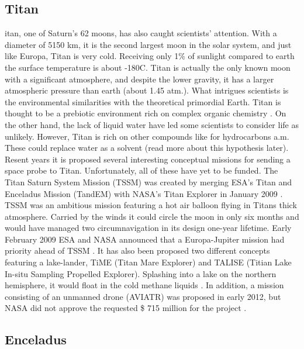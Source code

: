 \begin{multicols}{2}
\iffalse
\subsection{Titan}


 
itan, one of Saturn's 62 moons, has also caught scientists' attention.
With a diameter of 5150 km, it is the second largest moon in the solar system, and just like Europa, Titan is very cold.
Receiving only 1\% of sunlight compared to earth the surface temperature is about -180\degree C.
Titan is actually the only known moon with a significant atmosphere, and despite the lower gravity, it has a larger atmospheric pressure than earth (about 1.45 atm.).
What intrigues scientists is the environmental similarities with the theoretical primordial Earth.
Titan is thought to be a prebiotic environment rich on complex organic chemistry \cite{RichOrganics}. On the other hand, the lack of liquid water have led some scientists to consider life as unlikely.
However, Titan is rich on other compounds like for hydrocarbons a.m.
These could replace water as a solvent (read more about this hypothesis later).
Resent years it is proposed several interesting conceptual missions for sending a space probe to Titan. Unfortunately, all of these have yet to be funded.
The Titan Saturn System Mission (TSSM) was created by merging ESA’s Titan and Enceladus Mission (TandEM) with NASA’s Titan Explorer in January 2009 \cite{FPlan10}.
TSSM was an ambitious mission featuring a hot air balloon flying in Titans thick atmosphere.
Carried by the winds it could circle the moon in only six months and would have managed two circumnavigation in its design one-year lifetime.
Early February 2009 ESA and NASA announced that a Europa-Jupiter mission had priority ahead of TSSM \cite{FPlan07}.
It has also been proposed two different concepts featuring a lake-lander, TiME (Titan Mare Explorer) and TALISE (Titian Lake In-situ Sampling Propelled Explorer).
Splashing into a lake on the northern hemisphere, it would float in the cold methane liquids \cite{TiME} \cite{TALISE}.
In addition, a mission consisting of an unmanned drone (AVIATR) was proposed in early 2012, but NASA did not approve the requested \$ 715 million for the project \cite{AVIATR}.

\subsection{Enceladus}


\end{multicols}

